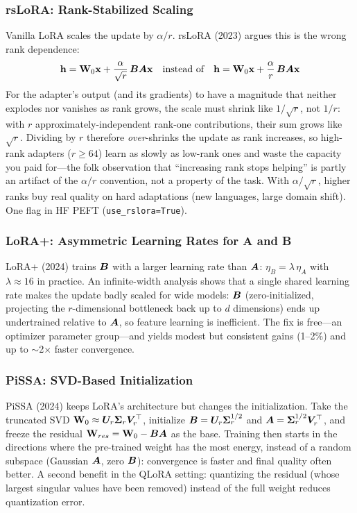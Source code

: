 \subsubsection{rsLoRA: Rank-Stabilized Scaling}

Vanilla LoRA scales the update by $\alpha/r$. rsLoRA (2023) argues this is the wrong rank dependence:
\begin{equation}
\mathbf{h} = \mathbf{W}_0\mathbf{x} + \frac{\alpha}{\sqrt{r}}\,\bm{B}\bm{A}\mathbf{x} \quad \text{instead of} \quad \mathbf{h} = \mathbf{W}_0\mathbf{x} + \frac{\alpha}{r}\,\bm{B}\bm{A}\mathbf{x}
\end{equation}
For the adapter's output (and its gradients) to have a magnitude that neither explodes nor vanishes as rank grows, the scale must shrink like $1/\sqrt{r}$, not $1/r$: with $r$ approximately-independent rank-one contributions, their sum grows like $\sqrt{r}$. Dividing by $r$ therefore \emph{over}-shrinks the update as rank increases, so high-rank adapters ($r \geq 64$) learn as slowly as low-rank ones and waste the capacity you paid for---the folk observation that ``increasing rank stops helping'' is partly an artifact of the $\alpha/r$ convention, not a property of the task. With $\alpha/\sqrt{r}$, higher ranks buy real quality on hard adaptations (new languages, large domain shift). One flag in HF PEFT (\texttt{use\_rslora=True}).

\subsubsection{LoRA+: Asymmetric Learning Rates for A and B}

LoRA+ (2024) trains $\bm{B}$ with a larger learning rate than $\bm{A}$: $\eta_B = \lambda\,\eta_A$ with $\lambda \approx 16$ in practice. An infinite-width analysis shows that a single shared learning rate makes the update badly scaled for wide models: $\bm{B}$ (zero-initialized, projecting the $r$-dimensional bottleneck back up to $d$ dimensions) ends up undertrained relative to $\bm{A}$, so feature learning is inefficient. The fix is free---an optimizer parameter group---and yields modest but consistent gains (1--2\%) and up to $\sim$2$\times$ faster convergence.

\subsubsection{PiSSA: SVD-Based Initialization}

PiSSA (2024) keeps LoRA's architecture but changes the initialization. Take the truncated SVD $\mathbf{W}_0 \approx \bm{U}_r \bm{\Sigma}_r \bm{V}_r^\top$, initialize $\bm{B} = \bm{U}_r \bm{\Sigma}_r^{1/2}$ and $\bm{A} = \bm{\Sigma}_r^{1/2}\bm{V}_r^\top$, and freeze the residual $\mathbf{W}_{res} = \mathbf{W}_0 - \bm{B}\bm{A}$ as the base. Training then starts in the directions where the pre-trained weight has the most energy, instead of a random subspace (Gaussian $\bm{A}$, zero $\bm{B}$): convergence is faster and final quality often better. A second benefit in the QLoRA setting: quantizing the residual (whose largest singular values have been removed) instead of the full weight reduces quantization error.

